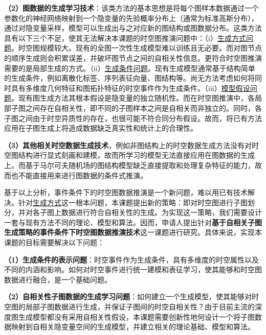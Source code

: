 \documentclass[12pt,UTF8,AutoFakeBold=2,a4paper]{ctexart} %
\begin{document}
\textbf{（2）图数据的生成学习技术}：该类方法的基本思想是将每个图样本数据通过一个参数化的神经网络映射到一个隐变量的先验概率分布上（通常为标准高斯分布），通过对隐变量采样，模型可以生成出与之对应新的图结构或图数据分布。这类方法具有以下三个不足，使其无法解决本课题的时空图推演问题中：（i）\underline{生成方式问题}。时空图规模较大。现有的全图一次性生成模型难以训练且无必要。而对图节点的顺序生成则会积累误差，并破坏图节点之间的自相关性信息。更符合时空图推演需要的是局部生成的方式。（ii）\underline{生成条件问题}。现有生成模型通常基于结构简单的生成条件，例如离散化标签、序列表征向量、图结构等。尚无方法考虑如何将同时具有多维度几何特征和图拓扑特征的时空事件作为生成条件。（iii）\underline{模型假设问题}。现有图生成方法其根本假设是隐变量的独立随机性。而在时空图推演中，各局部子图之间存在自相关性，即不同的子图样本之间是自相关而非独立的。同时，各子图之间由于时空异质性的存在，也很可能不符合同分布假设。故而，将已有方法应用在子图生成上将造成数据缺乏真实性和统计上的合理性。

\textbf{（3）其他相关时空数据生成技术}，例如非图结构上的时空数据生成方法没有对时空图结构进行显式刻画和建模，故而所学习的模型无法直接应用在图数据的生成上。而基于马尔可夫随机场的图结构模型缺乏直接提取和处理复杂特征的能力，故而也不能直接用来进行图数据的条件式推演。


基于以上分析，事件条件下的时空图数据推演是一个新问题，难以用已有技术解决。针对\underline{生成方式}这一根本问题，本课题提出新的策略：即对时空图进行子图划分，并对各子图上数据进行符合自相关性的生成。为实现这一策略，我们需要设计一套与现有方法不同的理论、模型和算法。因而，申请人提出针对\textbf{基于自相关子图生成策略的事件条件下时空图数据推演技术}这一课题进行研究。具体来说，实现本课题的目标需要解决以下问题：

\textbf{（1）生成条件的表示问题}：时空事件作为生成条件，具有多维度的时空属性以及不同的内涵和影响。如何对时空事件进行统一建模和表征学习，使其能够和时空图数据进行融合，是一个基础问题。

\textbf{（2）自相关性子图数据的生成学习问题}：如何建立一个生成模型，使其能够对时空图的局部子图数据进行生成，并保证子图间的时空自相关性？由于目前主流的深度图生成模型都没有采用自相关性假设，本课题需要创新性地何设计一个将子图数据映射到自相关隐变量空间的生成模型，并建立相关的理论基础、模型和算法。
\end{document}
